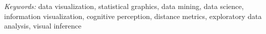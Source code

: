 \documentclass[12pt]{article}\usepackage[]{graphicx}\usepackage[]{color}
\newcommand{\hh}[1]{{\color{magenta} #1}}
\newcommand{\dc}[1]{{\color{orange} #1}}
\begin{document}
\noindent%
{\it Keywords:}  data visualization, statistical graphics, data mining, data science, information visualization, cognitive perception, distance metrics, exploratory data analysis, visual inference

% 

\end{document}
